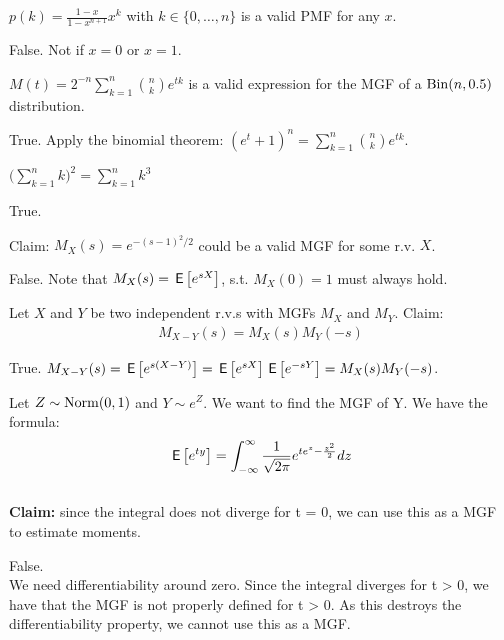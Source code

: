 \documentclass[tf-tutorial-all.tex]{subfiles}
\begin{document}
\begin{truefalse}
$p(k) = \frac{1-x}{1-x^{n+1}} x^k$ with $k \in \{0, \dots, n\}$ is a valid PMF for any $x$.
\begin{solution}
  False. Not if $x = 0$ or $x = 1$.
\end{solution}
\end{truefalse}

\begin{truefalse}
  $M(t) = 2^{-n} \sum_{k=1}^n \binom{n}{k} e^{tk}$ is a valid expression for the MGF of a $\mathrm{Bin}(n, 0.5)$ distribution.
\begin{solution}
True. Apply the binomial theorem: $(e^t + 1)^n = \sum_{k=1}^n \binom{n}{k} e^{tk}$.
\end{solution}
\end{truefalse}

\begin{truefalse}
$\big(\sum_{k=1}^n k \big)^2 = \sum_{k=1}^n k^3$
\begin{solution}
True.
\end{solution}
\end{truefalse}




\begin{truefalse}
Claim: $M_X(s)=e^{-(s-1)^2/2}$ could be a valid MGF for some r.v. $X$.
\begin{solution}
False. Note that $M_X(s)=\,\mathsf{E}\left[e^{sX}\right]$, s.t. $M_X(0)=1$ must always hold.
\end{solution}
\end{truefalse}





\begin{truefalse}
Let $X$ and $Y$ be two independent r.v.s with MGFs $M_X$ and $M_Y$. Claim:
\begin{align}
\label{eq:2}
M_{X-Y}(s)=M_X(s)M_Y(-s)
\end{align}
\begin{solution}
True. $M_{X-Y}(s)=\,\mathsf{E}\left[e^{s(X-Y)}\right]=\,\mathsf{E}\left[e^{sX}\right]\,\mathsf{E}\left[e^{-sY}\right]=M_X(s)M_Y(-s)$.
\end{solution}
\end{truefalse}

\begin{truefalse}
Let $Z \sim \mathrm{Norm}(0,1)$ and $Y \sim e^{Z}$. We want to find the MGF of Y.
We have the formula:
$$\,\mathsf{E}\left[e^{ty}\right] = \int^{\infty}_{-\infty} \frac{1}{\sqrt{2 \pi}} e^{t e^{z} - \frac{z^{2}}{2}} dz$$
\\ \textbf{Claim: } since the integral does not diverge for t = 0, we can use this as a MGF to estimate moments. 
\begin{solution}
    False.
    \\We need differentiability around zero. Since the integral diverges for t > 0, we have that the MGF is not properly defined for t > 0. As this destroys the differentiability property, we cannot use this as a MGF. 
\end{solution}
\end{truefalse}
\end{document}
